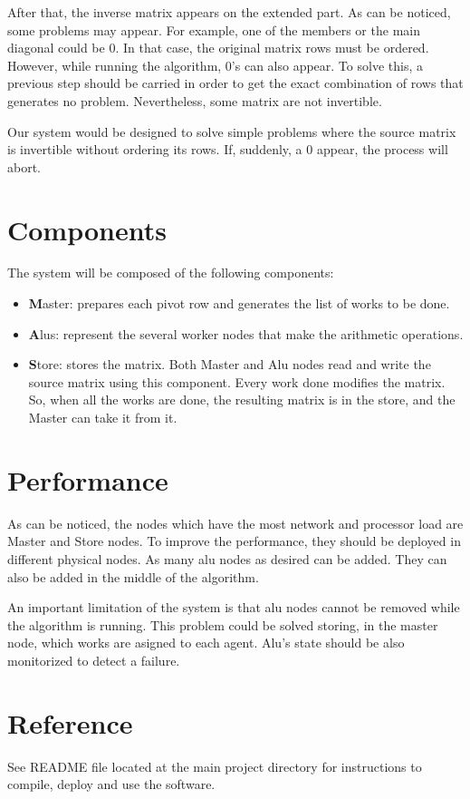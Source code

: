 \documentclass[a4paper,10pt,oneside]{article}
\begin{document}
After that, the inverse matrix appears on the extended part. As can be noticed, some problems may appear. For example, one of the members or the main diagonal could be 0. In that case, the original matrix rows must be ordered. However, while running the algorithm, 0's can also appear. To solve this, a previous step should be carried in order to get the exact combination of rows that generates no problem. Nevertheless, some matrix are not invertible.

Our system would be designed to solve simple problems where the source matrix is invertible without ordering its rows. If, suddenly, a 0 appear, the process will abort.

\section{Components}
The system will be composed of the following components:
\begin{itemize}
\item {\textbf Master:} prepares each pivot row and generates the list of works to be done. 
\item {\textbf Alus:} represent the several worker nodes that make the arithmetic operations.
\item {\textbf Store:} stores the matrix. Both Master and Alu nodes read and write the source matrix using this component. Every work done modifies the matrix. So, when all the works are done, the resulting matrix is in the store, and the Master can take it from it.
\end{itemize}

\section{Performance}
As can be noticed, the nodes which have the most network and processor load are Master and Store nodes. To improve the performance, they should be deployed in different physical nodes. As many alu nodes as desired can be added. They can also be added in the middle of the algorithm. 

An important limitation of the system is that alu nodes cannot be removed while the algorithm is running. This problem could be solved storing, in the master node, which works are asigned to each agent. Alu's state should be also monitorized to detect a failure.

\section{Reference}
See README file located at the main project directory for instructions to compile, deploy and use the software.
\end{document}
